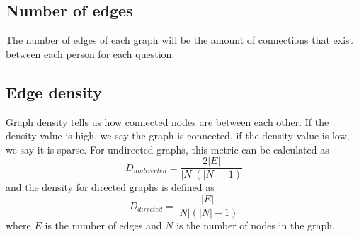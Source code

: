 \subsection{Number of edges}
The number of edges of each graph will be the amount of connections that exist between each person for each question.

\subsection{Edge density}
Graph density tells us how connected nodes are between each other. If the density value is high, we say the graph is connected, if the density value is low, we say it is sparse. For undirected graphs, this metric can be calculated as
\begin{equation}
    D_{undirected} = \frac{2|E|}{|N|(|N|-1)}
    \label{equation:undir_density}
\end{equation}
and the density for directed graphs is defined as
\begin{equation}
    D_{directed} = \frac{|E|}{|N|(|N|-1)}
    \label{equation:dir_density}
\end{equation}
where $E$ is the number of edges and $N$ is the number of nodes in the graph.


